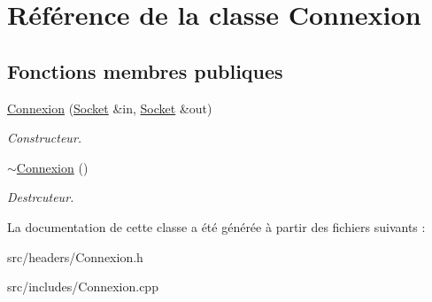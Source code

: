 \hypertarget{classConnexion}{\section{Référence de la classe Connexion}
\label{classConnexion}
}
\subsection*{Fonctions membres publiques}
\begin{DoxyCompactItemize}
\item 
\hypertarget{classConnexion_ace32af3d7fab1f520972d58be0a7ee40}{\hyperlink{classConnexion_ace32af3d7fab1f520972d58be0a7ee40}{Connexion} (\hyperlink{classSocket}{Socket} \&in, \hyperlink{classSocket}{Socket} \&out)}\label{classConnexion_ace32af3d7fab1f520972d58be0a7ee40}

\begin{DoxyCompactList}\small\item\em Constructeur. \end{DoxyCompactList}\item 
\hypertarget{classConnexion_a6afee761c33e160c2be5e9e2713968e3}{\hyperlink{classConnexion_a6afee761c33e160c2be5e9e2713968e3}{$\sim$\-Connexion} ()}\label{classConnexion_a6afee761c33e160c2be5e9e2713968e3}

\begin{DoxyCompactList}\small\item\em Destrcuteur. \end{DoxyCompactList}\end{DoxyCompactItemize}


La documentation de cette classe a été générée à partir des fichiers suivants \-:\begin{DoxyCompactItemize}
\item 
src/headers/Connexion.\-h\item 
src/includes/Connexion.\-cpp\end{DoxyCompactItemize}
